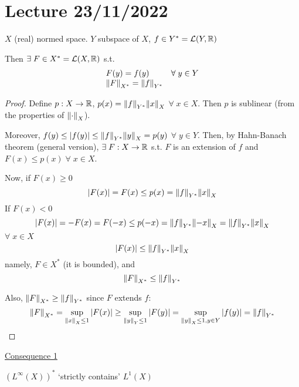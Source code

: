 \section{Lecture 23/11/2022}

\begin{theorem}
    \(X\) (real) normed space. \(Y\) subspace of \(X\), \(f \in Y^* = \mathcal{L}(Y, \mathbb{R})\)

    Then \(\exists \; F \in X^* = \mathcal{L}(X, \mathbb{R})\) s.t. 
    \[
        \begin{array}{lr}
            
            F(y) = f(y) & \forall \; y \in Y \\

            \norm{F}_{X^*} = \norm{f}_{Y^*}   & \\
        \end{array}
    \]
\end{theorem}
\begin{proof}
    Define \(p:X \to \mathbb{R}\), \(p(x) = \norm{f}_{Y^*} \norm{x}_X\) \(\forall \; x \in X\). Then \(p\) is sublinear (from the properties of \(\norm{\cdot}_X\)).

    Moreover, \(f(y) \leq \abs{f(y)} \leq \norm{f}_{Y^*}\norm{y}_X = p(y)\) \(\forall \; y \in Y\). Then, by Hahn-Banach theorem (general version), \(\exists \; F : X \to \mathbb{R}\) s.t. \(F\) is an extension of \(f\) and \(F(x) \leq p(x) \; \forall \; x \in X\).

    Now, if \(F(x) \geq 0\)
    \[
        \abs{F(x)} = F(x) \leq p(x) = \norm{f}_{Y^*}\norm{x}_X
    \]
    If \(F(x) < 0\)
    \[
        \abs{F(x)} = -F(x) = F(-x) \leq p(-x) = \norm{f}_{Y^*}\norm{-x}_X = \norm{f}_{Y^*}\norm{x}_X
    \]
    \(\forall \; x \in X\)
    \[
        \abs{F(x)} \leq \norm{f}_{Y^*}\norm{x}_X
    \]
    namely, \(F \in X^*\) (it is bounded), and 
    \[
        \norm{F}_{X^*} \leq \norm{f}_{Y^*}
    \]

    Also, \(\norm{F}_{X^*} \geq \norm{f}_{Y^*}\) since \(F\) extends \(f\):
    \[
        \norm{F}_{X^*} = \sup_{\norm{x}_X \leq 1} \abs{F(x)} \geq \sup_{\norm{y}_Y \leq 1}\abs{F(y)} 
        = \sup_{\norm{y}_X \leq 1, y \in Y} \abs{f(y)} = \norm{f}_{Y^*}
    \]
\end{proof}
\noindent\underline{Consequence 1}
\begin{theorem}
    \((L^\infty (X))^*\) `strictly contains' \(L^1(X)\)
\end{theorem}

